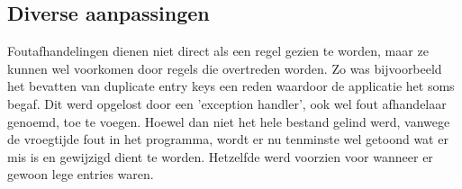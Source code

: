 
\subsection{Diverse aanpassingen}
Foutafhandelingen dienen niet direct als een regel gezien te worden, maar ze kunnen wel voorkomen door regels die overtreden worden. Zo was bijvoorbeeld het bevatten van duplicate entry keys een reden waardoor de applicatie het soms begaf. Dit werd opgelost door een 'exception handler', ook wel fout afhandelaar genoemd, toe te voegen. Hoewel dan niet het hele bestand gelind werd, vanwege de vroegtijde fout in het programma, wordt er nu tenminste wel getoond wat er mis is en gewijzigd dient te worden. Hetzelfde werd voorzien voor wanneer er gewoon lege entries waren. 
